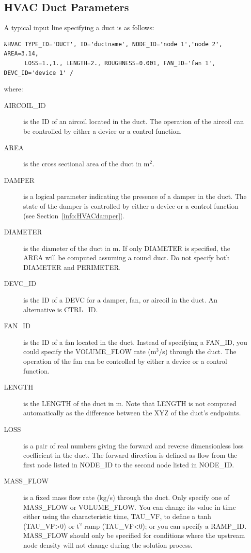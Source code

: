 \documentclass[11pt]{book}
\begin{document}
\subsection{HVAC Duct Parameters}
\label{info:HVACduct}

A typical input line specifying a duct is as follows:
\begin{lstlisting}
&HVAC TYPE_ID='DUCT', ID='ductname', NODE_ID='node 1','node 2', AREA=3.14,
      LOSS=1.,1., LENGTH=2., ROUGHNESS=0.001, FAN_ID='fan 1', DEVC_ID='device 1' /
\end{lstlisting}
where:
\begin{description}
\item[{\ct AIRCOIL\_ID}] is the {\ct ID} of an aircoil located in the duct.  The operation of the aircoil can be controlled by either a device or a control function.
\item[{\ct AREA}] is the cross sectional area of the duct in m$^2$.
\item[{\ct DAMPER}] is a logical parameter indicating the presence of a damper in the duct. The state of the damper is controlled by either a device or a control function (see Section~\ref{info:HVACdamper}).
\item[{\ct DIAMETER}] is the diameter of the duct in m.  If only {\ct DIAMETER} is specified, the {\ct AREA} will be computed assuming a round duct.  Do not specify both {\ct DIAMETER} and {\ct PERIMETER}.
\item[{\ct DEVC\_ID}]  is the {\ct ID} of a {\ct DEVC} for a damper, fan, or aircoil in the duct. An alternative is {\ct CTRL\_ID}.
\item[{\ct FAN\_ID}] is the {\ct ID} of a fan located in the duct. Instead of specifying a {\ct FAN\_ID}, you could specify the {\ct VOLUME\_FLOW} rate (m$^3$/s) through the duct. The operation of the fan can be controlled by either a device or a control function.
\item[{\ct LENGTH}] is the {\ct LENGTH} of the duct in m.  Note that {\ct LENGTH} is not computed automatically as the difference between the {\ct XYZ} of the duct's endpoints.
\item[{\ct LOSS}] is a pair of real numbers giving the forward and reverse dimensionless loss coefficient in the duct.  The forward direction is defined as flow from the first node listed in {\ct NODE\_ID} to the second node listed in {\ct NODE\_ID}.
\item[{\ct MASS\_FLOW}] is a fixed mass flow rate (kg/s) through the duct.  Only specify one of {\ct MASS\_FLOW} or {\ct VOLUME\_FLOW}.  You can change its value in time either using the characteristic time, {\ct TAU\_VF},  to define a tanh ({\ct TAU\_VF}>0) or t$^2$ ramp ({\ct TAU\_VF}<0); or you can specify a {\ct RAMP\_ID}.  {\ct MASS\_FLOW} should only be specified for conditions where the upstream node density will not change during the solution process.

\end{description}
\end{document}
